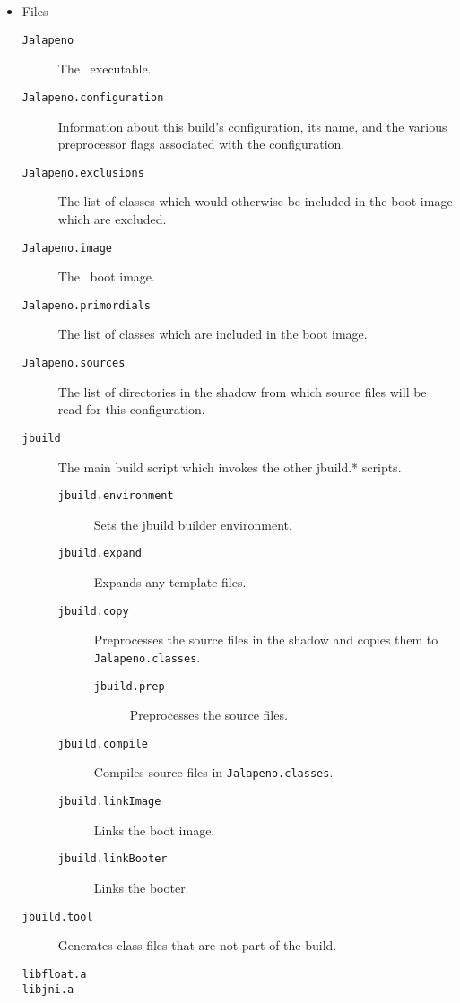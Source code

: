 \begin{itemize}
\begin{description}
   \end{description}
\item Files
   \begin{description}
   \item [{\tt Jalapeno}] The \jp\ executable.
   \item [{\tt Jalapeno.configuration}] Information
         about this build's configuration, its name, and the various
         preprocessor flags associated with the configuration.
   \item [{\tt Jalapeno.exclusions}] The list of
         classes which would otherwise be included in the boot image
         which are excluded.
   \item [{\tt Jalapeno.image}] The \jp\ boot image.
   \item [{\tt Jalapeno.primordials}] The list of classes which are
         included in the boot image.
   \item [{\tt Jalapeno.sources}] The list of directories
         in the shadow from which
         source files will be read for this configuration.
   \item [{\tt jbuild}] The main build script which invokes the other
      jbuild.* scripts.
      \begin{description}
      \item [{\tt jbuild.environment}] Sets the jbuild builder environment.
      \item [{\tt jbuild.expand}] Expands any template files.
      \item [{\tt jbuild.copy}] Preprocesses the source files in the
            shadow and copies them to {\tt Jalapeno.classes}.
         \begin{description}
         \item [{\tt jbuild.prep}] Preprocesses the source files.
         \end{description}
      \item [{\tt jbuild.compile}] Compiles source files
            in {\tt Jalapeno.classes}.
      \item [{\tt jbuild.linkImage}] Links the boot image.
      \item [{\tt jbuild.linkBooter}] Links the booter.
      \end{description}
   \item [{\tt jbuild.tool}] Generates class files that are not part
         of the build.
   \item [{\tt libfloat.a}]
   \item [{\tt libjni.a}]
   \end{description}
\end{itemize}

